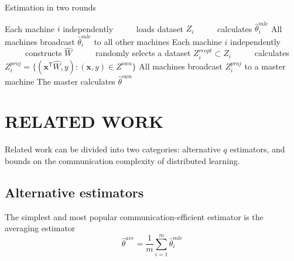 \documentclass[twoside]{article}
\newcommand{\Zproj}{Z^{\textit{proj}}}
\newcommand{\Zreopt}{Z^{\textit{owa}}}
\newcommand{\x}{\mathbf{x}}
\newcommand{\w}{\theta}
\newcommand{\wowa}{\hat\w^{owa}}
\newcommand{\wave}{\hat\w^{ave}}
\newcommand{\wmle}{\hat\w^{mle}}
\newcommand{\trans}[1]{\ensuremath{{#1}^{\mathsf{T}}}}
\begin{document}
\begin{algorithm}[t]
\caption{Estimation in two rounds}
\label{alg:distributed}
\begin{algorithmic}
\State Each machine $i$ independently
\State ~~~~~loads dataset $Z_i$
\State ~~~~~calculates $\wmle_i$
\State All machines broadcast $\wmle_i$ to all other machines
\State Each machine $i$ independently
\State ~~~~~constructs $\hat W$
\State ~~~~~randomly selects a dataset $Z^{reopt}_i\subset Z_i$
\State ~~~~~calculates $\Zproj_i=\{(\trans\x\hat W,y) : (\x,y)\in\Zreopt\}$
\State All machines broadcast $\Zproj_i$ to a master machine
\State The master calculates $\wowa$
\end{algorithmic}
\label{fig:alg2}
\end{algorithm}


\section{RELATED WORK}

Related work can be divided into two categories:
alternative $q$ estimators,
and bounds on the communication complexity of distributed learning.

\subsection{Alternative estimators}
\label{sec:alt}
The simplest and most popular communication-efficient estimator is the averaging estimator
\begin{equation}
\wave = \frac{1}{m}\sum_{i=1}^m \wmle_i
\end{equation}
\end{document}

